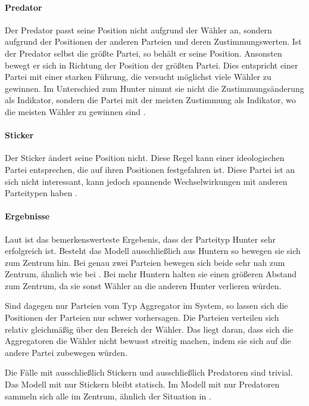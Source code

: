 \paragraph{Predator} Der Predator passt seine Position nicht aufgrund der Wähler an, sondern aufgrund der Positionen der anderen Parteien und deren Zustimmungswerten. Ist der Predator selbst die größte Partei, so behält er seine Position. Ansonsten bewegt er sich in Richtung der Position der größten Partei. Dies entspricht einer Partei mit einer starken Führung, die versucht möglichst viele Wähler zu gewinnen. Im Unterschied zum Hunter nimmt sie nicht die Zustimmungsänderung als Indikator, sondern die Partei mit der meisten Zustimmung als Indikator, wo die meisten Wähler zu gewinnen sind \citep[S.\,267]{laver2005policy}.

\paragraph{Sticker} Der Sticker ändert seine Position nicht. Diese Regel kann einer ideologischen Partei entsprechen, die auf ihren Positionen festgefahren ist. Diese Partei ist an sich nicht interessant, kann jedoch spannende Wechselwirkungen mit anderen Parteitypen haben \citep[S.\,267]{laver2005policy}.

\paragraph{Ergebnisse}
Laut \citet{laver2005policy} ist das bemerkenswerteste Ergebenis, dass der Parteityp Hunter sehr erfolgreich ist. Besteht das Modell ausschließlich aus Huntern so bewegen sie sich zum Zentrum hin. Bei genau zwei Parteien bewegen sich beide sehr nah zum Zentrum, ähnlich wie bei \citet{hotelling1929}. Bei mehr Huntern halten sie einen größeren Abstand zum Zentrum, da sie sonst Wähler an die anderen Hunter verlieren würden. \citep[S.\,267-270]{laver2005policy}

Sind dagegen nur Parteien vom Typ Aggregator im System, so lassen sich die Positionen der Parteien nur schwer vorhersagen. Die Parteien verteilen sich relativ gleichmäßig über den Bereich der Wähler. Das liegt daran, dass sich die Aggregatoren die Wähler nicht bewusst streitig machen, indem sie sich auf die andere Partei zubewegen würden. \citep[S.\,270-271]{laver2005policy}

Die Fälle mit ausschließlich Stickern und ausschließlich Predatoren sind trivial. Das Modell mit nur Stickern bleibt statisch. Im Modell mit nur Predatoren sammeln sich alle im Zentrum, ähnlich der Situation in \citet{hotelling1929}.

